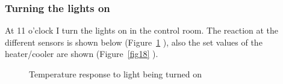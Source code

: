 \documentclass[12pt]{scrartcl}
\begin{document}
      \subsubsection{Turning the lights on}
      At 11 o'clock I turn the lights on in the control room. The reaction at
      the different sensors is shown below (Figure~\ref{fig17} ), also the set
      values of the heater/cooler are shown (Figure~\ref{fig18} ).
      \begin{figure}[h!]
        \hspace{-40pt}
        \hspace{-20pt}
        \caption{Temperature response to light being turned on}
        \label{fig17}
      \end{figure} \\
\end{document}
